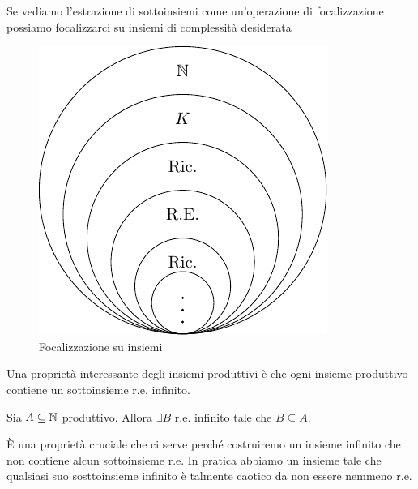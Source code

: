 Se vediamo l'estrazione di sottoinsiemi come un'operazione di focalizzazione possiamo focalizzarci
su insiemi di complessità desiderata 

\begin{figure}[h]
    \centering
    \includegraphics{img/SetsResolution.pdf}
    \caption{Focalizzazione su insiemi}
\end{figure}

Una proprietà interessante degli insiemi produttivi è che ogni insieme produttivo contiene un
sottoinsieme r.e. infinito.

\begin{thm}
    Sia $A \subseteq \mathbb{N}$ produttivo. Allora $\exists B$ r.e. infinito tale che $B \subseteq A$.
\end{thm}

È una proprietà cruciale che ci serve perché costruiremo un insieme infinito che non contiene
alcun sottoinsieme r.e. In pratica abbiamo un insieme tale che qualsiasi suo sosttoinsieme infinito
è talmente caotico da non essere nemmeno r.e.

